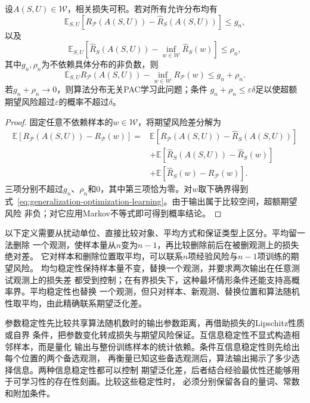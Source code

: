 \begin{theorem}[期望泛化差与经验最优性]
\label{thm:generalization-optimization-learning}
设$A(S,U)\in\mathcal W$，相关损失可积。若对所有允许分布均有
\[
 \mathbb E_{S,U}[R_{\mathcal P}(A(S,U))-\hat R_S(A(S,U))]\leq g_n,
\]
以及
\[
 \mathbb E_{S,U}\!\left[\hat R_S(A(S,U))-
 \inf_{w\in\mathcal W}\hat R_S(w)\right]\leq\rho_n,
\]
其中$g_n,\rho_n$为不依赖具体分布的非负数，则
\begin{equation}
 \mathbb E_{S,U}R_{\mathcal P}(A(S,U))-
 \inf_{w\in\mathcal W}R_{\mathcal P}(w)
 \leq g_n+\rho_n.
 \label{eq:generalization-optimization-learning}
\end{equation}
若$g_n+\rho_n\to0$，则算法分布无关PAC学习此问题；条件
$g_n+\rho_n\leq\varepsilon\delta$足以使超额期望风险超过$\varepsilon$的概率不超过$\delta$。
\end{theorem}
\begin{proof}
固定任意不依赖样本的$w\in\mathcal W$，将期望风险差分解为
\begin{align*}
 \mathbb E[R_{\mathcal P}(A(S,U))-R_{\mathcal P}(w)]
 ={}&\mathbb E[R_{\mathcal P}(A(S,U))-\hat R_S(A(S,U))]\\
 &+\mathbb E[\hat R_S(A(S,U))-\hat R_S(w)]\\
 &+\mathbb E[\hat R_S(w)-R_{\mathcal P}(w)].
\end{align*}
三项分别不超过$g_n$、$\rho_n$和0，其中第三项恰为零。对$w$取下确界得到
式~\eqref{eq:generalization-optimization-learning}。由于输出属于比较空间，超额期望风险
非负；对它应用Markov不等式即可得到概率结论。
\end{proof}

以下定义需要从扰动单位、直接比较对象、平均方式和保证类型上区分。平均留一法删除
一个观测，使样本量从$n$变为$n-1$，再比较删除前后在被删观测上的损失绝对差。
它对样本和删除位置取平均，可以联系$n$项经验风险与$n-1$项训练的期望风险。
均匀稳定性保持样本量不变，替换一个观测，并要求两次输出在任意测试观测上的损失差
都受到控制；在有界损失下，这种最坏情形条件还能支持高概率界。平均稳定性也替换
一个观测，但只对样本、新观测、替换位置和算法随机性取平均，由此精确联系期望泛化差。

参数稳定性先比较共享算法随机数时的输出参数距离，再借助损失的Lipschitz性质或自界
条件，把参数变化转成损失与期望风险保证。互信息稳定性不显式构造相邻样本，而是量化
输出与整份训练样本的统计依赖。条件互信息稳定性则先给出每个位置的两个备选观测，
再衡量已知这些备选观测后，算法输出揭示了多少选择信息。两种信息稳定性都可以控制
期望泛化差，后者结合经验最优性还能够用于可学习性的存在性刻画。比较这些稳定性时，
必须分别保留各自的量词、常数和附加条件。

